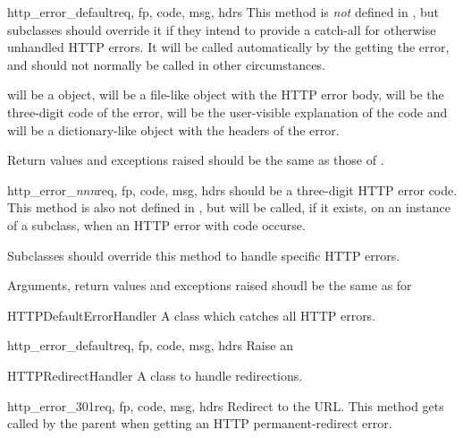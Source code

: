 \begin{methoddesc}[BaseHandler]{http_error_default}{req, fp, code, msg, hdrs}
This method is {\em not} defined in , but subclasses
should override it if they intend to provide a catch-all for otherwise
unhandled HTTP errors. It will be called automatically by the 
 getting the error, and should not normally be called
in other circumstances.

 will be a  object,  will be a file-like
object with the HTTP error body,  will be the three-digit code
of the error,  will be the user-visible explanation of the
code and  will be a dictionary-like object with the headers of
the error.

Return values and exceptions raised should be the same as those
of .
\end{methoddesc}

\begin{methoddesc}[BaseHandler]{http_error_{\em nnn}}{req, fp, code, msg, hdrs}
 should be a three-digit HTTP error code. This method is also
not defined in , but will be called, if it exists, on
an instance of a subclass, when an HTTP error with code  occurse.

Subclasses should override this method to handle specific HTTP errors.

Arguments, return values and exceptions raised shoudl be the same as for
\end{methoddesc}


\begin{classdesc}{HTTPDefaultErrorHandler}{}
A class which catches all HTTP errors.
\end{classdesc}

\begin{methoddesc}[HTTPDefaultErrorHandler]{http_error_default}{req, fp, code, 
                                                                msg, hdrs}
Raise an 
\end{methoddesc}

\begin{classdesc}{HTTPRedirectHandler}{}
A class to handle redirections.
\end{classdesc}

\begin{methoddesc}[HTTPRedirectHandler]{http_error_301}{req, fp, code, 
                                                        msg, hdrs}
Redirect to the  URL. This method gets called by
the parent  when getting an HTTP permanent-redirect
error.
\end{methoddesc}

